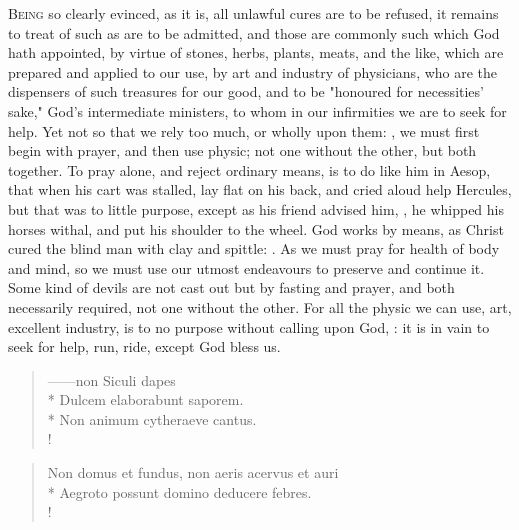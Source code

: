 {\lettrine{B}{eing} so clearly evinced, as it is, all unlawful cures are to be
refused, it remains to treat of such as are to be admitted, and those are
commonly such which God hath appointed, by virtue of
stones, herbs, plants, meats, and the like, which are prepared and applied to
our use, by art and industry of physicians, who are the dispensers of such
treasures for our good, and to be "honoured for
necessities' sake," God's intermediate ministers, to whom in our infirmities we
are to seek for help. Yet not so that we rely too much, or wholly upon them:
, we must first begin with prayer,
and then use physic; not one without the other, but both together. To pray
alone, and reject ordinary means, is to do like him in Aesop, that when his
cart was stalled, lay flat on his back, and cried aloud help Hercules, but that
was to little purpose, except as his friend advised him, , he whipped his horses withal, and put his shoulder to the wheel.
God works by means, as Christ cured the blind man with clay and spittle:
. As we must pray for health
of body and mind, so we must use our utmost endeavours to preserve and continue
it. Some kind of devils are not cast out but by fasting and prayer, and both
necessarily required, not one without the other. For all the physic we can use,
art, excellent industry, is to no purpose without calling upon God, : it is in vain to seek for help, run,
ride, except God bless us.


\begin{latin}
\begin{verse}%
------non Siculi dapes\\*
Dulcem elaborabunt saporem.\\*
Non animum cytheraeve cantus.\\!
\end{verse}%
\end{latin}



\begin{latin}
\begin{verse}%
Non domus et fundus, non aeris acervus et auri\\*
Aegroto possunt domino deducere febres.\\!
\end{verse}%
\end{latin}



}
